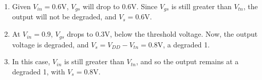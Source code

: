 \documentclass{article}
\begin{document}
\begin{enumerate}
\begin{enumerate}[label=\alph*)]
		\item Given \(V_{in} = 0.6\text{V}\), \(V_{gs}\) will drop to \(0.6\text{V}\). Since \(V_{gs}\) is still greater than \(V_{tn}\), the  output will not be degraded, and \(V_{s} = 0.6\text{V}\). 
		\item At \(V_{in} = 0.9\), \(V_{gs}\) drops to \(0.3\text{V}\), below the threshold voltage. Now, the output voltage is degraded, and \(V_{s} = V_{DD} - V_{tn} = 0.8\text{V}\), a degraded 1.
		\item In this case, \(V_{in}\) is still greater than \(V_{tn}\), and so the output remains at a degraded 1, with \(V_{s} = 0.8\text{V}\).
	\end{enumerate}
\end{enumerate}
\end{document}
